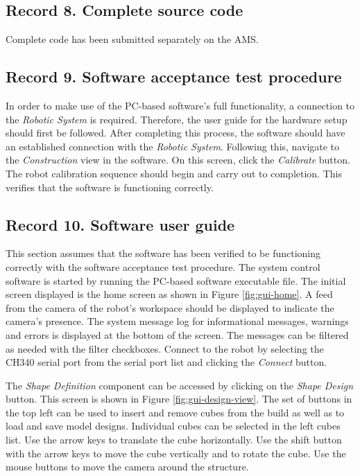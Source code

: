 \newpage

\subsection{Record 8. Complete source code}
Complete code has been submitted separately on the AMS.

\newpage

\subsection{Record 9. Software acceptance test procedure}

In order to make use of the PC-based software's full functionality, a connection to the \textit{Robotic System} is required. Therefore, the user guide for the hardware setup should first be followed. After completing this process, the software should have an established connection with the \textit{Robotic System}. Following this, navigate to the \textit{Construction} view in the software. On this screen, click the \textit{Calibrate} button. The robot calibration sequence should begin and carry out to completion. This verifies that the software is functioning correctly.

\newpage

\subsection{Record 10. Software user guide}

This section assumes that the software has been verified to be functioning correctly with the software acceptance test procedure. The system control software is started by running the PC-based software executable file. The initial screen displayed is the home screen as shown in Figure \ref{fig:gui-home}. A feed from the camera of the robot's workspace should be displayed to indicate the camera's presence. The system message log for informational messages, warnings and errors is displayed at the bottom of the screen. The messages can be filtered as needed with the filter checkboxes. Connect to the robot by selecting the CH340 serial port from the serial port list and clicking the \textit{Connect} button.

The \textit{Shape Definition} component can be accessed by clicking on the \textit{Shape Design} button. This screen is shown in Figure \ref{fig:gui-design-view}. The set of buttons in the top left can be used to insert and remove cubes from the build as well as to load and save model designs. Individual cubes can be selected in the left cubes list. Use the arrow keys to translate the cube horizontally. Use the shift button with the arrow keys to move the cube vertically and to rotate the cube. Use the mouse buttons to move the camera around the structure.

